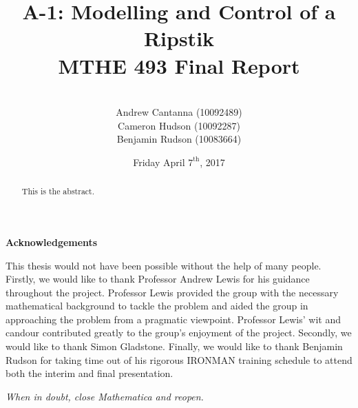 \documentclass[11pt,letterpaper]{article}
\title{ A-1: Modelling and Control of a Ripstik\textsuperscript{\textregistered} \\MTHE 493 Final Report}
\date{Friday April $7^{\textrm{th}}$, 2017}
\author{\\Andrew Cantanna (10092489) \\Cameron Hudson (10092287)\\
	Benjamin Rudson (10083664)\\}
\theoremstyle{definition}
\begin{document}
	\begin{titlepage}
		\maketitle
		\thispagestyle{empty}		
	\end{titlepage}
	\newpage
\begin{abstract}
	This is the abstract.
\end{abstract}	
\clearpage
\newpage
\begin{center}
\textbf{Acknowledgements}
\end{center}
This thesis would not have been possible without the help of many people. 
Firstly, we would like to thank Professor Andrew Lewis for his guidance throughout the project. 
Professor Lewis provided the group with the necessary mathematical background to tackle the problem and aided the group in approaching the problem from a pragmatic viewpoint. 
Professor Lewis' wit and candour contributed greatly to the group's enjoyment of the project.
Secondly, we would like to thank Simon Gladstone.
Finally, we would like to thank Benjamin Rudson for taking time out of his rigorous IRONMAN training schedule to attend both the interim and final presentation. 

\vspace*{\fill}
\begin{center}
\textit{When in doubt, close Mathematica and reopen.}
\end{center}
\newpage	
	\renewcommand{\baselinestretch}{0.75}\normalsize
	\tableofcontents
	\renewcommand{\baselinestretch}{1.0}\normalsize

\newpage
\listoffigures
\newpage
\listoftables


\clearpage
{}
	
	\newpage



	\pagestyle{fancy}






\newpage
\printbibliography
\end{document}
